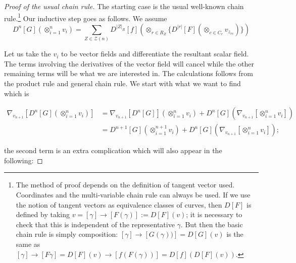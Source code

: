 \documentclass[11pt]{article}
\theoremstyle{remark}
\begin{document}
\begin{proof}[Proof of the usual chain rule]
The starting
case is the usual well-known chain rule.\footnote{The method of proof
depends on the definition of tangent vector used. Coordinates and the
multi-variable chain rule can always be used. If we use the notion of
tangent vectors as equivalence classes of curves, then $D[F]$ is defined
by taking $ v= [\gamma] \to [F(\gamma)] \ensuremath{:=} D[F](v)$; it is necessary to
check that 
this is independent of the representative $\gamma$. But then the basic
chain rule is simply composition: $ [\gamma] \to [G(\gamma))] = D[G](v)$ is the
same as $[ \gamma] \to [F \gamma] = D[F](v)  \to [f(F(\gamma))]=  
D[f](D[F](v))$.} 
Our inductive step goes as follows. We assume  
\begin{equation*}
\ensuremath{D^{n} [{G}] ({\mathop{\otimes}_{i=1}^n v_i}) } 
= \sum_{\ensuremath{Z} \in \ensuremath{\mathcal{\ensuremath{Z}}}(n)} 
\ensuremath{D^{ |\ensuremath{Z}|_R } [{f}] ({ \mathop{\otimes}_{r \in R_{\ensuremath{Z}}} \{\ensuremath{D^{ |r| } [{F}] {} }
(\mathop{\otimes}_{c \in C_{r}} v_{\ensuremath{z}_{rc}} )\}}) } 
\end{equation*}


Let us take the $v_i$ to be vector fields and differentiate the
resultant scalar field. The terms involving the derivatives of the
vector field will cancel while the other remaining terms will be what
we are interested in.
The calculations follows from the product rule and general
chain rule. 
We start with what we want to find which is

\begin{align*}
\ensuremath{{{\nabla}}_{v_{n+1}}^{}{[\ensuremath{D^{n} [{G}] ({\mathop{\otimes}_{i=1}^n v_i}) }]}} &=
\ensuremath{{{\nabla}}_{v_{n+1}}^{}{[\ensuremath{D^{n} [{G}] {} }]}}(\mathop{\otimes}_{i=1}^n v_i) 
+ \ensuremath{D^{n} [{G}] ({\ensuremath{{{\nabla}}_{v_{n+1}}^{}{[\mathop{\otimes}_{i=1}^n v_i]}}}) } \\
 &=
{\ensuremath{D^{n+1} [{G}] {} }}(\mathop{\otimes}_{i=1}^{n+1} v_i) 
+ \ensuremath{D^{n} [{G}] ({\ensuremath{{{\nabla}}_{v_{n+1}}^{}{[\mathop{\otimes}_{i=1}^n v_i]}}}) };
\end{align*}

the second term is an extra complication which will also appear
in the following:


\end{proof}
\end{document}
